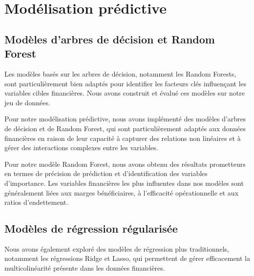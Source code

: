 \documentclass[11pt]{report}
\begin{document}
\chapter{Modélisation prédictive}
\section{Modèles d'arbres de décision et Random Forest}
Les modèles basés sur les arbres de décision, notamment les Random Forests, sont particulièrement bien adaptés pour identifier les facteurs clés influençant les variables cibles financières. Nous avons construit et évalué ces modèles sur notre jeu de données.

Pour notre modélisation prédictive, nous avons implémenté des modèles d'arbres de décision et de Random Forest, qui sont particulièrement adaptés aux données financières en raison de leur capacité à capturer des relations non linéaires et à gérer des interactions complexes entre les variables.


Pour notre modèle Random Forest, nous avons obtenu des résultats prometteurs en termes de précision de prédiction et d'identification des variables d'importance. Les variables financières les plus influentes dans nos modèles sont généralement liées aux marges bénéficiaires, à l'efficacité opérationnelle et aux ratios d'endettement.

\section{Modèles de régression régularisée}
Nous avons également exploré des modèles de régression plus traditionnels, notamment les régressions Ridge et Lasso, qui permettent de gérer efficacement la multicolinéarité présente dans les données financières.

% 
\end{document}
